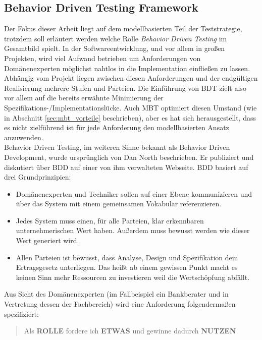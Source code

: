 \subsection{Behavior Driven Testing Framework}
\label{sec:bdd}
Der Fokus dieser Arbeit liegt auf dem modellbasierten Teil der Teststrategie, trotzdem soll erläutert werden welche Rolle \textit{Behavior Driven Testing} im Gesamtbild spielt. In der Softwareentwicklung, und vor allem in großen Projekten, wird viel Aufwand betrieben um Anforderungen von Domänenexperten möglichst nahtlos in die Implementation einfließen zu lassen. Abhängig vom Projekt liegen zwischen diesen Anforderungen und der endgültigen Realisierung mehrere Stufen und Parteien. Die Einführung von BDT zielt also vor allem auf die bereits erwähnte Minimierung der Spezifikations-/Implementationslücke. Auch MBT optimiert diesen Umstand (wie in Abschnitt \ref{sec:mbt_vorteile} beschrieben), aber es hat sich herausgestellt, dass es nicht zielführend ist für jede Anforderung den modellbasierten Ansatz anzuwenden.\\
Behavior Driven Testing, im weiteren Sinne bekannt als Behavior Driven Development, wurde ursprünglich von Dan North beschrieben. Er publiziert und diskutiert über BDD auf einer von ihm verwalteten Webseite\cite{north_official_2015}. BDD basiert auf drei Grundprinzipien:

\begin{itemize}
\item Domänenexperten und Techniker sollen auf einer Ebene kommunizieren und über das System mit einem gemeinsamen Vokabular referenzieren.
\item Jedes System muss einen, für alle Parteien, klar erkennbaren unternehmerischen Wert haben. Außerdem muss bewusst werden wie dieser Wert generiert wird.
\item Allen Parteien ist bewusst, dass Analyse, Design und Spezifikation dem Ertragsgesetz unterliegen. Das heißt ab einem gewissen Punkt macht es keinen Sinn mehr Ressourcen zu investieren weil die Wertschöpfung abfällt.
\end{itemize}

Aus Sicht des Domänenexperten (im Fallbeispiel ein Bankberater und in Vertretung dessen der Fachbereich) wird eine Anforderung folgendermaßen spezifiziert: 

\begin{quote} Als \textbf{ROLLE} fordere ich \textbf{ETWAS} und gewinne dadurch \textbf{NUTZEN} \end{quote}

